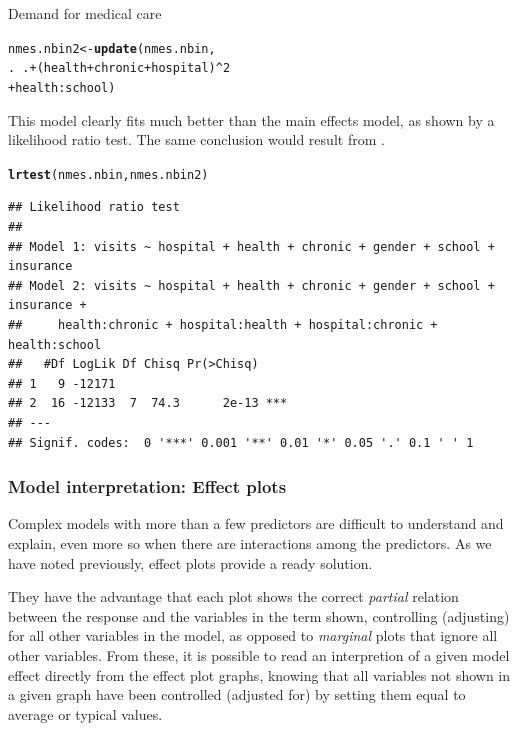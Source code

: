 \documentclass[11pt]{book}\usepackage[]{graphicx}\usepackage[]{color}
\makeatletter
\newcommand{\hlnum}[1]{\textcolor[rgb]{0.686,0.059,0.569}{#1}}%
\newcommand{\hlopt}[1]{\textcolor[rgb]{0,0,0}{#1}}%
\newcommand{\hlstd}[1]{\textcolor[rgb]{0.345,0.345,0.345}{#1}}%
\newcommand{\hlkwb}[1]{\textcolor[rgb]{0.69,0.353,0.396}{#1}}%
\newcommand{\hlkwd}[1]{\textcolor[rgb]{0.737,0.353,0.396}{\textbf{#1}}}%
\newenvironment{kframe}{%
 \def\at@end@of@kframe{}%
 \ifinner\ifhmode%
  \def\at@end@of@kframe{\end{minipage}}%
  \begin{minipage}{\columnwidth}%
 \fi\fi%
 \def\FrameCommand##1{\hskip\@totalleftmargin \hskip-\fboxsep
 \colorbox{shadecolor}{##1}\hskip-\fboxsep
     \hskip-\linewidth \hskip-\@totalleftmargin \hskip\columnwidth}%
 \MakeFramed {\advance\hsize-\width
   \@totalleftmargin\z@ \linewidth\hsize
   \@setminipage}}%
 {\par\unskip\endMakeFramed%
 \at@end@of@kframe}
\newenvironment{knitrout}{}{} %
\renewenvironment{knitrout}{\small\renewcommand{\baselinestretch}{.85}}{} %
\makeatother
\begin{document}
\begin{Example}[nmes2]{Demand for medical care}
\begin{knitrout}
\color{fgcolor}\begin{kframe}
\begin{alltt}
\hlstd{nmes.nbin2} \hlkwb{<-} \hlkwd{update}\hlstd{(nmes.nbin,}
                     \hlstd{.} \hlopt{~} \hlstd{.} \hlopt{+} \hlstd{(health}\hlopt{+}\hlstd{chronic}\hlopt{+}\hlstd{hospital)}\hlopt{^}\hlnum{2}
                           \hlopt{+} \hlstd{health}\hlopt{:}\hlstd{school)}
\end{alltt}
\end{kframe}
\end{knitrout}
This model clearly fits much better than the main effects model, as
shown by a likelihood ratio test. The same
conclusion would result from .
\begin{knitrout}
\color{fgcolor}\begin{kframe}
\begin{alltt}
\hlkwd{lrtest}\hlstd{(nmes.nbin, nmes.nbin2)}
\end{alltt}
\begin{verbatim}
## Likelihood ratio test
## 
## Model 1: visits ~ hospital + health + chronic + gender + school + insurance
## Model 2: visits ~ hospital + health + chronic + gender + school + insurance + 
##     health:chronic + hospital:health + hospital:chronic + health:school
##   #Df LogLik Df Chisq Pr(>Chisq)    
## 1   9 -12171                        
## 2  16 -12133  7  74.3      2e-13 ***
## ---
## Signif. codes:  0 '***' 0.001 '**' 0.01 '*' 0.05 '.' 0.1 ' ' 1
\end{verbatim}
\end{kframe}
\end{knitrout}
\end{Example}

\subsubsection{Model interpretation: Effect plots}
Complex models with more than a few predictors are difficult to
understand and explain, even more so when there are interactions among
the predictors. As we have noted previously, effect plots \citep{Fox:87,FoxAndersen:2006}
provide a ready solution.

They have the advantage that each plot shows the correct \emph{partial}
relation between the response and the variables in the term shown,
controlling (adjusting) for all other variables in the model, as opposed
to \emph{marginal} plots that ignore all other variables.
From these, it is possible to read an interpretion of a given model
effect directly from the effect plot graphs, knowing that all variables
not shown in a given graph have been controlled (adjusted for) by setting them
equal to average or typical values.
\end{document}
